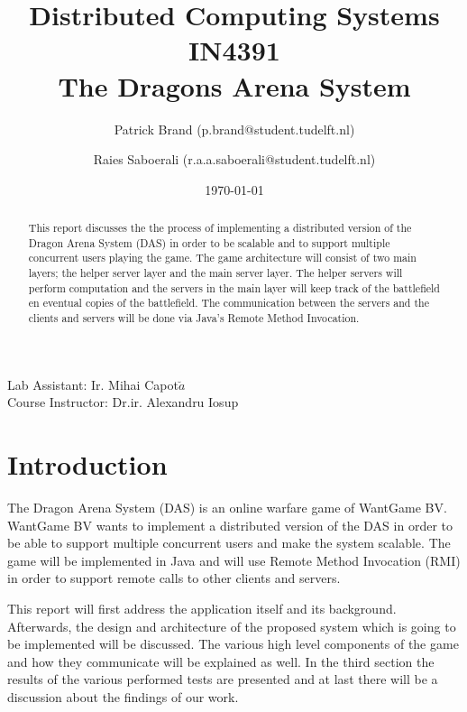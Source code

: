 \documentclass{article}
\title{Distributed Computing Systems IN4391\\ The Dragons Arena System %
}
\author{Patrick Brand (p.brand@student.tudelft.nl) \and
    Raies Saboerali (r.a.a.saboerali@student.tudelft.nl)
}
\date{\today}
\begin{document}
\maketitle
\thispagestyle{empty}
\begin{center}
Lab Assistant: Ir. Mihai Capot$\breve{a}$ \\
Course Instructor: Dr.ir. Alexandru Iosup
\end{center}

\begin{abstract}
This report discusses the the process of implementing a distributed version of the Dragon Arena System (DAS) in order to be scalable and to support multiple concurrent users playing the game.
The game architecture will consist of two main layers; the helper server layer and the main server layer.
The helper servers will perform computation and the servers in the main layer will keep track of the battlefield en eventual copies of the battlefield.
The communication between the servers and the clients and servers will be done via Java's Remote Method Invocation.
\end{abstract}


\section{Introduction}

The Dragon Arena System (DAS) is an online warfare game of WantGame BV.
WantGame BV wants to implement a distributed version of the DAS in order to be able to support multiple concurrent users and make the system scalable.
The game will be implemented in Java and will use Remote Method Invocation (RMI) in order to support remote calls to other clients and servers.

This report will first address the application itself and its background.
Afterwards, the design and architecture of the proposed system which is going to be implemented will be discussed. 
The various high level components of the game and how they communicate will be explained as well.
In the third section the results of the various performed tests are presented and at last there will be a discussion about the findings of our work.

\newpage









  


\end{document}
